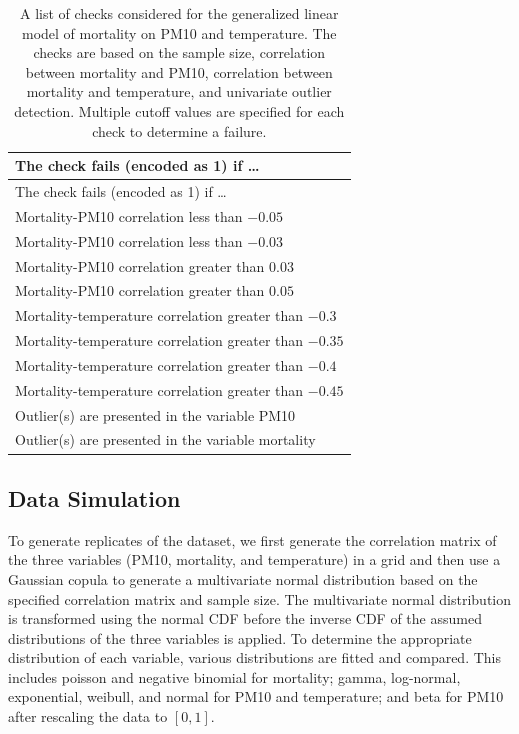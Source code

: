 \documentclass[
  12pt,
]{interact}
\begin{document}
\begin{longtable}[]{@{}l@{}}
\caption{A list of checks considered for the generalized linear model of
mortality on PM10 and temperature. The checks are based on the sample
size, correlation between mortality and PM10, correlation between
mortality and temperature, and univariate outlier detection. Multiple
cutoff values are specified for each check to determine a
failure.}\label{tbl-checks}\tabularnewline
\toprule\noalign{}
The check fails (encoded as 1) if \ldots{} \\
\midrule\noalign{}
\endfirsthead
\toprule\noalign{}
The check fails (encoded as 1) if \ldots{} \\
\midrule\noalign{}
\endhead
\bottomrule\noalign{}
\endlastfoot
Mortality-PM10 correlation less than \(-0.05\) \\
Mortality-PM10 correlation less than \(-0.03\) \\
Mortality-PM10 correlation greater than \(0.03\) \\
Mortality-PM10 correlation greater than \(0.05\) \\
Mortality-temperature correlation greater than \(-0.3\) \\
Mortality-temperature correlation greater than \(-0.35\) \\
Mortality-temperature correlation greater than \(-0.4\) \\
Mortality-temperature correlation greater than \(-0.45\) \\
Outlier(s) are presented in the variable PM10 \\
Outlier(s) are presented in the variable mortality \\
\end{longtable}

\subsection{Data Simulation}\label{data-simulation}

To generate replicates of the dataset, we first generate the correlation
matrix of the three variables (PM10, mortality, and temperature) in a
grid and then use a Gaussian copula to generate a multivariate normal
distribution based on the specified correlation matrix and sample size.
The multivariate normal distribution is transformed using the normal CDF
before the inverse CDF of the assumed distributions of the three
variables is applied. To determine the appropriate distribution of each
variable, various distributions are fitted and compared. This includes
poisson and negative binomial for mortality; gamma, log-normal,
exponential, weibull, and normal for PM10 and temperature; and beta for
PM10 after rescaling the data to \([0,1]\).
\end{document}
